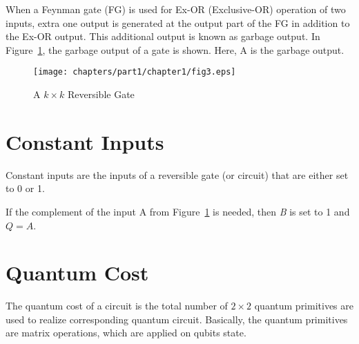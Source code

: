 
\begin{example}\textnormal{
	When a Feynman gate (FG) is used for Ex-OR (Exclusive-OR) operation of two inputs, extra one output is generated at the output part of the FG in addition to the Ex-OR output. This additional output is known as garbage output. In Figure~\ref{fig:p1_c1_fig3}, the garbage output of a gate is shown. Here, A is the garbage output.}
\end{example}

\begin{figure}[H]
	\centering
	\texttt{[image: chapters/part1/chapter1/fig3.eps]}
	\caption{A $k \times k$ Reversible Gate}
	\label{fig:p1_c1_fig3}
\end{figure}

\section{Constant Inputs}
Constant inputs are the inputs of a reversible gate (or circuit) that are either set to 0 or 1.

\begin{example}\textnormal{
	If the complement of the input A from Figure~\ref{fig:p1_c1_fig3} is needed, then \textit{B} is set to 1 and $Q = A$.}
\end{example}

\section{Quantum Cost}

	The quantum cost of a circuit is the total number of $2 \times 2$ quantum primitives are used to realize corresponding quantum circuit. Basically, the quantum primitives are matrix operations, which are applied on qubits state.%




